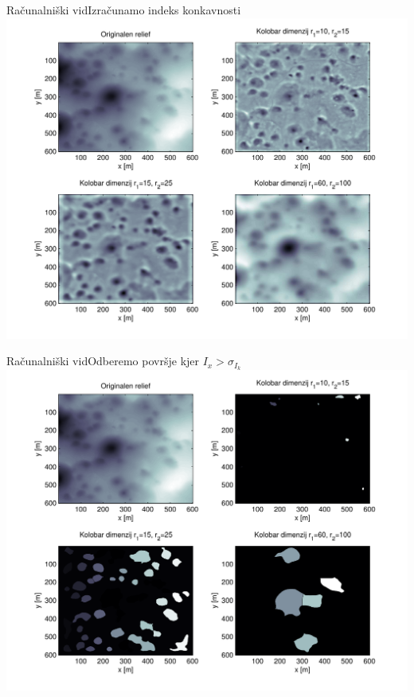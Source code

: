 \documentclass{beamer}
\begin{document}
\begin{frame}{Računalniški vid}{Izračunamo indeks konkavnosti}
    \includegraphics[width=\textwidth]{slike/concavity-samples}
\end{frame}

\begin{frame}{Računalniški vid}{Odberemo površje kjer $I_x > \sigma_{I_k}$}
    \includegraphics[width=\textwidth]{slike/concavity-segmentation-samples}
\end{frame}
\end{document}
